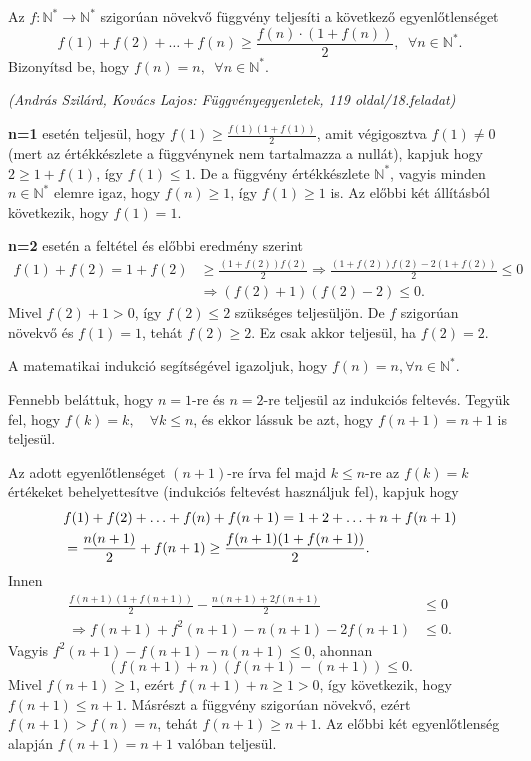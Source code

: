 \begin{extraproblem}
	Az $f:\mathbb{N}^{*}\rightarrow\mathbb{N}^{*}$ szigorúan növekvő
	függvény teljesíti a következő egyenlőtlenséget 
	\[
	f(1)+f(2)+\ldots+f(n)\geq\frac{f(n)\cdot(1+f(n))}{2},\phantom{a}\forall n\in\mathbb{N}^{*}.
	\]
	Bizonyítsd be, hogy $f(n)=n,\phantom{a}\forall n\in\mathbb{N}^{*}.$
	\begin{flushright}
		\textit{(András Szilárd, Kovács Lajos: Függvényegyenletek, 119 oldal/18.feladat)} 
		\par\end{flushright}
\end{extraproblem}
\begin{solution}
	\textbf{n=1} esetén teljesül, hogy $f(1)\geq\frac{f(1)(1+f(1))}{2}$,
	amit végigosztva $f(1)\neq0$ (mert az értékkészlete a függvénynek
	nem tartalmazza a nullát), kapjuk hogy $2\geq1+f(1)$, így $f(1)\leq1.$
	De a függvény értékkészlete $\mathbb{N}^{*}$, vagyis minden $n\in\mathbb{N}^{*}$
	elemre igaz, hogy $f(n)\geq1$, így $f(1)\geq1$ is. Az előbbi két
	állításból következik, hogy $f(1)=1.$
	
	\textbf{n=2} esetén a feltétel és előbbi eredmény szerint 
	\begin{align*}
		f(1)+f(2)=1+f(2) & \geq\frac{(1+f(2))f(2)}{2}\Rightarrow\frac{(1+f(2))f(2)-2(1+f(2))}{2}\leq0\\
		& \Rightarrow(f(2)+1)(f(2)-2)\leq0.
	\end{align*}
	Mivel $f(2)+1>0$, így $f(2)\leq2$ szükséges teljesüljön. De $f$
	szigorúan növekvő és $f(1)=1$, tehát $f(2)\geq2$. Ez csak akkor
	teljesül, ha $f(2)=2$.
	
	A matematikai indukció segítségével igazoljuk, hogy $f(n)=n,\forall n\in\mathbb{N}^{*}.$
	
	Fennebb beláttuk, hogy $n=1$-re és $n=2$-re teljesül az indukciós
	feltevés. Tegyük fel, hogy $f(k)=k,\quad\forall k\leq n$, és ekkor
	lássuk be azt, hogy $f(n+1)=n+1$ is teljesül.
	
	Az adott egyenlőtlenséget $(n+1)$-re írva fel majd $k\leq n$-re
	az $f(k)=k$ értékeket behelyettesítve (indukciós feltevést használjuk
	fel), kapjuk hogy 
	\begin{align*}
		\centering & f(1)+f(2)+\ldots+f(n)+f(n+1)=1+2+\ldots+n+f(n+1)\\
		& =\frac{n(n+1)}{2}+f(n+1)\geq\frac{f(n+1)(1+f(n+1))}{2}.
	\end{align*}
	Innen 
	\begin{align*}
		\frac{f(n+1)(1+f(n+1))}{2}-\frac{n(n+1)+2f(n+1)}{2} & \leq0\\
		\Rightarrow f(n+1)+f^{2}(n+1)-n(n+1)-2f(n+1) & \leq0.
	\end{align*}
	Vagyis $f^{2}(n+1)-f(n+1)-n(n+1)\leq0$, ahonnan 
	\[
	(f(n+1)+n)(f(n+1)-(n+1))\leq0.
	\]
	Mivel $f(n+1)\geq1$, ezért $f(n+1)+n\geq1>0$, így következik, hogy
	$f(n+1)\leq n+1$. Másrészt a függvény szigorúan növekvő, ezért $f(n+1)>f(n)=n$,
	tehát $f(n+1)\geq n+1$. Az előbbi két egyenlőtlenség alapján $f(n+1)=n+1$
	valóban teljesül.
	

\end{solution}
